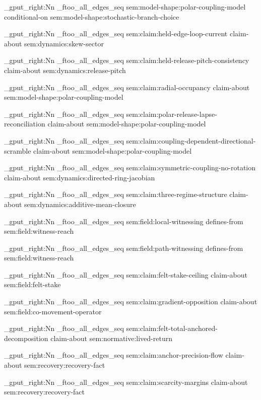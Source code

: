 \seq_gput_right:Nn \g_ftoo_all_edges_seq { { sem:model-shape:polar-coupling-model } { conditional-on } { sem:model-shape:stochastic-branch-choice } }

\seq_gput_right:Nn \g_ftoo_all_edges_seq { { sem:claim:held-edge-loop-current } { claim-about } { sem:dynamics:skew-sector } }

\seq_gput_right:Nn \g_ftoo_all_edges_seq { { sem:claim:held-release-pitch-consistency } { claim-about } { sem:dynamics:release-pitch } }

\seq_gput_right:Nn \g_ftoo_all_edges_seq { { sem:claim:radial-occupancy } { claim-about } { sem:model-shape:polar-coupling-model } }

\seq_gput_right:Nn \g_ftoo_all_edges_seq { { sem:claim:polar-release-lapse-reconciliation } { claim-about } { sem:model-shape:polar-coupling-model } }

\seq_gput_right:Nn \g_ftoo_all_edges_seq { { sem:claim:coupling-dependent-directional-scramble } { claim-about } { sem:model-shape:polar-coupling-model } }

\seq_gput_right:Nn \g_ftoo_all_edges_seq { { sem:claim:symmetric-coupling-no-rotation } { claim-about } { sem:dynamics:directed-ring-jacobian } }

\seq_gput_right:Nn \g_ftoo_all_edges_seq { { sem:claim:three-regime-structure } { claim-about } { sem:dynamics:additive-mean-closure } }

\seq_gput_right:Nn \g_ftoo_all_edges_seq { { sem:field:local-witnessing } { defines-from } { sem:field:witness-reach } }

\seq_gput_right:Nn \g_ftoo_all_edges_seq { { sem:field:path-witnessing } { defines-from } { sem:field:witness-reach } }

\seq_gput_right:Nn \g_ftoo_all_edges_seq { { sem:claim:felt-stake-ceiling } { claim-about } { sem:field:felt-stake } }

\seq_gput_right:Nn \g_ftoo_all_edges_seq { { sem:claim:gradient-opposition } { claim-about } { sem:field:co-movement-operator } }

\seq_gput_right:Nn \g_ftoo_all_edges_seq { { sem:claim:felt-total-anchored-decomposition } { claim-about } { sem:normative:lived-return } }

\seq_gput_right:Nn \g_ftoo_all_edges_seq { { sem:claim:anchor-precision-flow } { claim-about } { sem:recovery:recovery-fact } }

\seq_gput_right:Nn \g_ftoo_all_edges_seq { { sem:claim:scarcity-margins } { claim-about } { sem:recovery:recovery-fact } }

